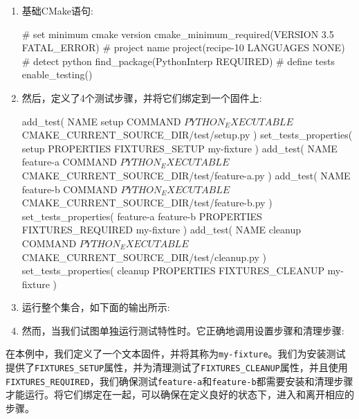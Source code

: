 \begin{enumerate}
\item 基础CMake语句:

\begin{codebox}[cmake]
# set minimum cmake version
cmake_minimum_required(VERSION 3.5 FATAL_ERROR)
# project name
project(recipe-10 LANGUAGES NONE)
# detect python
find_package(PythonInterp REQUIRED)
# define tests
enable_testing()
\end{codebox}

\item 然后，定义了4个测试步骤，并将它们绑定到一个固件上:

\begin{codebox}[cmake]
add_test(
  NAME setup
  COMMAND ${PYTHON_EXECUTABLE} ${CMAKE_CURRENT_SOURCE_DIR}/test/setup.py
  )
set_tests_properties(
  setup
  PROPERTIES
    FIXTURES_SETUP my-fixture
  )
add_test(
  NAME feature-a
  COMMAND ${PYTHON_EXECUTABLE} ${CMAKE_CURRENT_SOURCE_DIR}/test/feature-a.py
  )
add_test(
  NAME feature-b
  COMMAND ${PYTHON_EXECUTABLE} ${CMAKE_CURRENT_SOURCE_DIR}/test/feature-b.py
  )
set_tests_properties(
  feature-a
  feature-b
  PROPERTIES
    FIXTURES_REQUIRED my-fixture
  )
add_test(
  NAME cleanup
  COMMAND ${PYTHON_EXECUTABLE} ${CMAKE_CURRENT_SOURCE_DIR}/test/cleanup.py
  )
set_tests_properties(
  cleanup
  PROPERTIES
    FIXTURES_CLEANUP my-fixture
  )
\end{codebox}

\item 运行整个集合，如下面的输出所示:


\item 然而，当我们试图单独运行测试特性时。它正确地调用设置步骤和清理步骤:


\end{enumerate}


在本例中，我们定义了一个文本固件，并将其称为\texttt{my-fixture}。我们为安装测试提供了\texttt{FIXTURES\_SETUP}属性，并为清理测试了\texttt{FIXTURES\_CLEANUP}属性，并且使用\texttt{FIXTURES\_REQUIRED}，我们确保测试\texttt{feature-a}和\texttt{feature-b}都需要安装和清理步骤才能运行。将它们绑定在一起，可以确保在定义良好的状态下，进入和离开相应的步骤。


